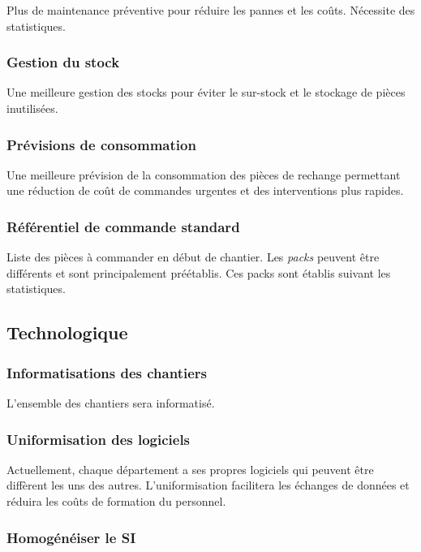 \documentclass[twoside]{article}
\begin{document}
Plus de maintenance préventive pour réduire les pannes et les coûts.
Nécessite des statistiques.

\subsubsection{Gestion du stock}
	Une meilleure gestion des stocks pour éviter le sur-stock et le stockage de
pièces inutilisées.

\subsubsection{Prévisions de consommation}
	Une meilleure prévision de la consommation des pièces de rechange
permettant une réduction de coût de commandes urgentes et des interventions
plus rapides.

\subsubsection{Référentiel de commande standard}
	Liste des pièces à commander en début de chantier. Les {\sl packs} peuvent être
différents et sont principalement préétablis. Ces packs sont établis suivant
les statistiques.


\subsection{Technologique}

\subsubsection{Informatisations des chantiers}

L’ensemble des chantiers sera informatisé.

\subsubsection{Uniformisation des logiciels}

Actuellement, chaque département a ses propres logiciels qui peuvent être
diffèrent les uns des autres. L’uniformisation facilitera les échanges de
données et réduira les coûts de formation du personnel.

\subsubsection{Homogénéiser le SI}
\end{document}
